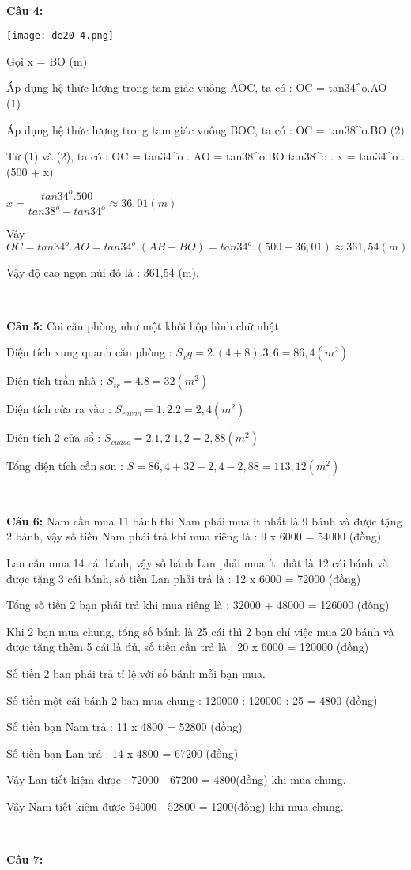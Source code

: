 \documentclass[12pt]{article}
\begin{document}
\    

\textbf{Câu 4:} \par

\begin{center}
    \texttt{[image: de20-4.png]}
\end{center}
Gọi x = BO (m) \par
Áp dụng hệ thức lượng trong tam giác vuông AOC, ta có : OC = tan34^o.AO (1)\par
Áp dụng hệ thức lượng trong tam giác vuông BOC, ta có : OC = tan38^o.BO (2)\par
Từ (1) và (2), ta có : OC = tan34^o . AO = tan38^o.BO \rightarrow  tan38^o . x = tan34^o . (500 + x) \par
$x = \dfrac{tan34^o.500}{tan38^o - tan34^o} \approx 36,01 (m)$ \par
Vậy $OC = tan34^o.AO = tan34^o.(AB + BO) = tan34^o.(500 + 36,01) \approx 361,54 (m)$ \par
Vậy độ cao ngọn núi đó là : 361,54 (m).

\    

\textbf{Câu 5:} Coi căn phòng như một khối hộp hình chữ nhật\par
Diện tích xung quanh căn phòng : $S_xq = 2.(4 + 8).3,6 = 86,4 (m^2)$ \par
Diện tích trần nhà : $S_{tr} = 4.8 = 32 (m^2)$ \par
Diện tích cửa ra vào : $S_{ravao} = 1,2.2 = 2,4 (m^2)$ \par
Diện tích 2 cửa sổ : $S_{cuaso} = 2.1,2.1,2 = 2,88 (m^2)$ \par
Tổng diện tích cần sơn : $S = 86,4 + 32 - 2,4 - 2,88 = 113,12 (m^2)$

\    

\textbf{Câu 6:} Nam cần mua 11 bánh thì Nam phải mua ít nhất là 9 bánh và được tặng 2 bánh, vậy số tiền Nam phải trả khi mua riêng là : 9 x 6000 = 54000 (đồng) \par 
Lan cần mua 14 cái bánh, vậy số bánh Lan phải mua ít nhất là 12 cái bánh và được tặng 3 cái bánh, số tiền Lan phải trả là : 12 x 6000 = 72000 (đồng) \par
Tổng số tiền 2 bạn phải trả khi mua riêng là : 32000 + 48000 = 126000 (đồng) \par
Khi 2 bạn mua chung, tổng số bánh là 25 cái thì 2 bạn chỉ việc mua 20 bánh và được tặng thêm 5 cái là đủ, số tiền cần trả là : 20 x 6000 = 120000 (đồng) \par
Số tiền 2 bạn phải trả tỉ lệ với số bánh mỗi bạn mua. \par
Số tiền một cái bánh 2 bạn mua chung : 120000 : 120000 : 25 = 4800 (đồng) \par
Số tiền bạn Nam trả : 11 x 4800 = 52800 (đồng) \par
Số tiền bạn Lan  trả : 14 x 4800 = 67200 (đồng) \par
Vậy Lan tiết kiệm được : 72000 - 67200 = 4800(đồng) khi mua chung. \par
Vậy Nam tiết kiệm được 54000 - 52800 = 1200(đồng) khi mua chung.

\   

\textbf{Câu 7:} \par

\break
\end{document}
